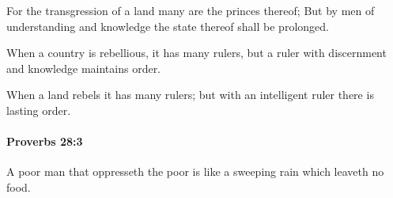 			\begin{versebox}
					\item[BHS] 
					\item[ASV] For the transgression of a land many are the princes thereof; But by men of understanding and knowledge the state thereof shall be prolonged.
					\item[NIV] When a country is rebellious, it has many rulers, but a ruler with discernment and knowledge maintains order.
					\item[NRSV] When a land rebels it has many rulers; but with an intelligent ruler there is lasting order.
			\end{versebox}

		\paragraph{Proverbs 28:3} %
			\label{PROVERBS-28-3}

			A poor man that oppresseth the poor is like a sweeping rain which leaveth no food.


